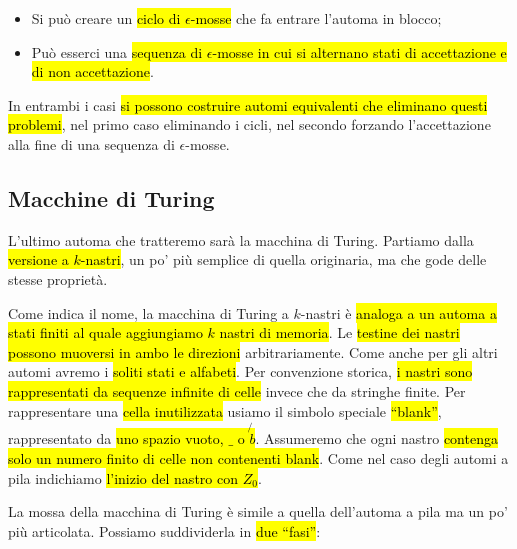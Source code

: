 \documentclass[a4paper,11pt,twoside]{article}
\theoremstyle{plain}
\theoremstyle{definition}
\theoremstyle{remark}
\begin{document}
\begin{itemize}
  \item Si può creare un \hl{ciclo di $\epsilon$-mosse} che fa entrare l'automa
    in blocco;
  \item Può esserci una \hl{sequenza di $\epsilon$-mosse in cui si alternano
    stati di accettazione e di non accettazione}.
\end{itemize}

In entrambi i casi \hl{si possono costruire automi equivalenti che eliminano
questi problemi}, nel primo caso eliminando i cicli, nel secondo forzando
l'accettazione alla fine di una sequenza di $\epsilon$-mosse.

\subsection{Macchine di Turing}\label{sec:macchine-turing}

L'ultimo automa che tratteremo sarà la macchina di Turing. Partiamo dalla
\hl{versione a $k$-nastri}, un po' più semplice di quella originaria, ma che
gode delle stesse proprietà.

Come indica il nome, la macchina di Turing a $k$-nastri è \hl{analoga a un
automa a stati finiti al quale aggiungiamo $k$ nastri di memoria}. Le
\hl{testine dei nastri possono muoversi in ambo le direzioni} arbitrariamente.
Come anche per gli altri automi avremo i \hl{soliti stati e alfabeti}. Per
convenzione storica, \hl{i nastri sono rappresentati da sequenze infinite di
celle} invece che da stringhe finite. Per rappresentare una \hl{cella
inutilizzata} usiamo il simbolo speciale \hl{``blank''}, rappresentato da
\hl{uno spazio vuoto, $\_$ o $\not{b}$}. Assumeremo che ogni nastro \hl{contenga
solo un numero finito di celle non contenenti blank}. Come nel caso degli automi
a pila indichiamo \hl{l'inizio del nastro con $Z_0$}.

La mossa della macchina di Turing è simile a quella dell'automa a pila ma un po'
più articolata. Possiamo suddividerla in \hl{due ``fasi''}:
\end{document}

